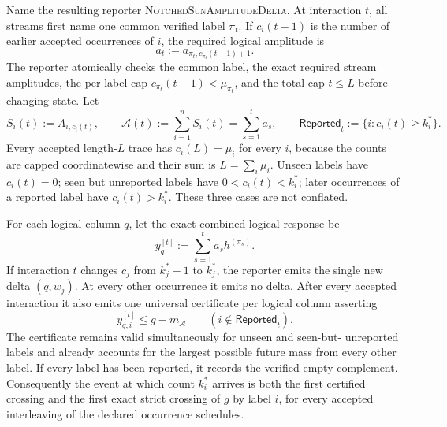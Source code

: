 \begin{theorem}
Name the resulting reporter \textsc{NotchedSunAmplitudeDelta}.  At
interaction $t$, all streams first name one common verified label $\pi_t$.
If $c_i(t-1)$ is the number of earlier accepted occurrences of $i$, the
required logical amplitude is
\begin{equation}
 a_t:=a_{\pi_t,c_{\pi_t}(t-1)+1}.
 \label{eq:notched-sun-amplitude-event}
\end{equation}
The reporter atomically checks the common label, the exact required stream
amplitudes, the per-label cap $c_{\pi_t}(t-1)<\mu_{\pi_t}$, and the total
cap $t\leq L$ before changing state.  Let
\begin{equation}
 S_i(t):=A_{i,c_i(t)},
 \qquad
 \mathcal A(t):=\sum_{i=1}^{n}S_i(t)=\sum_{s=1}^{t}a_s,
 \qquad
 \mathsf{Reported}_t:=\{i:c_i(t)\geq k_i^*\}.
 \label{eq:notched-sun-amplitude-prefix-state}
\end{equation}
Every accepted length-$L$ trace has $c_i(L)=\mu_i$ for every $i$, because
the counts are capped coordinatewise and their sum is $L=\sum_i\mu_i$.
Unseen labels have $c_i(t)=0$; seen but unreported labels have
$0<c_i(t)<k_i^*$; later occurrences of a reported label have
$c_i(t)>k_i^*$.  These three cases are not conflated.

For each logical column $q$, let the exact combined logical response be
\begin{equation*}
 y_q^{[t]}:=\sum_{s=1}^{t}a_sh^{(\pi_s)}.
\end{equation*}
If interaction $t$ changes $c_j$ from $k_j^*-1$ to $k_j^*$, the reporter
emits the single new delta $(q,w_j)$.  At every other occurrence it emits no
delta.  After every accepted interaction it also emits one universal
certificate per logical column asserting
\begin{equation}
 y_{q,i}^{[t]}\leq g-m_{\mathcal A}
 \qquad(i\notin\mathsf{Reported}_t).
 \label{eq:notched-sun-amplitude-certificate}
\end{equation}
The certificate remains valid simultaneously for unseen and seen-but-
unreported labels and already accounts for the largest possible future mass
from every other label.  If every label has been reported, it records the
verified empty complement.  Consequently the event at which count $k_i^*$
arrives is both the first certified crossing and the first exact strict
crossing of $g$ by label $i$, for every accepted interleaving of the declared
occurrence schedules.


\end{theorem}
